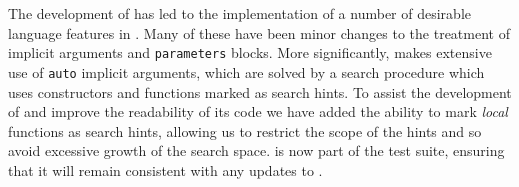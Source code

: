 The development of \Frexlib{} has led to the implementation of a number of
desirable language features in \idris{}.
%
Many of these have been minor changes to the treatment of implicit
arguments and \texttt{parameters} blocks.
%
More significantly, \Frexlib{} makes extensive use of \texttt{auto}
implicit arguments, which are solved by a search procedure which uses
constructors and functions marked as search hints.  To assist
the development of \Frexlib{} and improve the readability of its code we have added the
ability to mark \emph{local} functions as search hints, allowing
us to restrict the scope of the hints and so avoid excessive
growth of the search space.
%
\Frexlib{} is now part of the \idris{} test suite, ensuring that it will
remain consistent with any updates to \idris{}.
